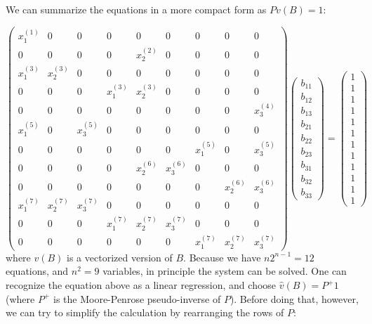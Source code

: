 \documentclass[
]{book}
\begin{document}
We can summarize the equations in a more compact form as \(P v(B)=1\):

\[
\begin{pmatrix}
x_1^{(1)} & 0 & 0 & 0 & 0 & 0 & 0 & 0 & 0 \\
0 & 0 & 0 & 0 & x_2^{(2)} & 0 & 0 & 0 & 0 \\
x_1^{(3)} & x_2^{(3)} & 0 & 0 & 0 & 0 & 0 & 0 & 0 \\
0 & 0 & 0 & x_1^{(3)} & x_2^{(3)} & 0 & 0 & 0 & 0 \\
0 & 0 & 0 & 0 & 0 & 0 & 0 & 0 & x_3^{(4)} \\
x_1^{(5)} & 0 & x_3^{(5)} & 0 & 0 & 0 & 0 & 0 & 0 \\
0 & 0 & 0 & 0 & 0 & 0 & x_1^{(5)} & 0 & x_3^{(5)} \\
0 & 0 & 0 & 0 & x_2^{(6)} & x_3^{(6)} & 0 & 0 & 0 \\
0 & 0 & 0 & 0 & 0 & 0 & 0 & x_2^{(6)} & x_3^{(6)}\\
x_1^{(7)} & x_2^{(7)} & x_3^{(7)} & 0 & 0 & 0 & 0 & 0 & 0 \\
0 & 0 & 0 & x_1^{(7)} & x_2^{(7)} & x_3^{(7)} & 0 & 0 & 0 \\
0 & 0 & 0 & 0 & 0 & 0 & x_1^{(7)} & x_2^{(7)} & x_3^{(7)} 
\end{pmatrix}
\begin{pmatrix}
b_{11}\\
b_{12}\\
b_{13}\\
b_{21}\\
b_{22}\\
b_{23}\\
b_{31}\\
b_{32}\\
b_{33}
\end{pmatrix} 
= 
\begin{pmatrix}
1\\
1\\
1\\
1\\
1\\
1\\
1\\
1\\
1\\
1\\
1\\
1
\end{pmatrix}
\]
where \(v(B)\) is a vectorized version of \(B\). Because we have \(n 2^{n-1} = 12\) equations, and \(n^2 = 9\) variables, in principle the system can be solved. One can recognize the equation above as a linear regression, and choose \(\hat{v}(B) = P^{+}1\) (where \(P^{+}\) is the Moore-Penrose pseudo-inverse of \(P\)). Before doing that, however, we can try to simplify the calculation by rearranging the rows of \(P\):
\end{document}
